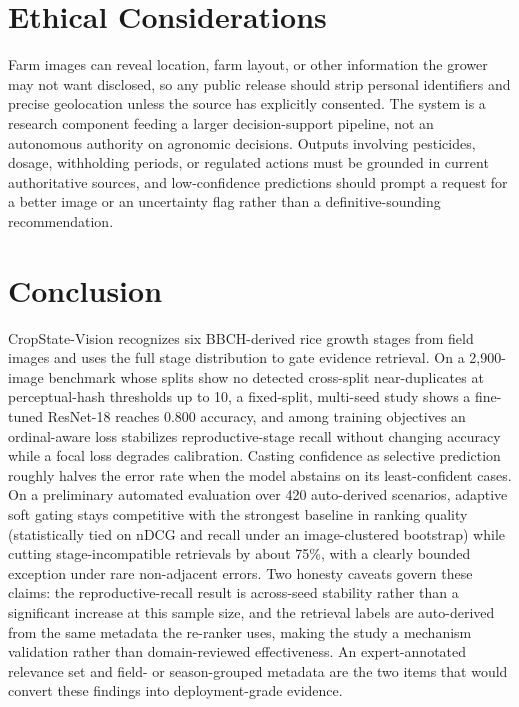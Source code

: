 \documentclass{llncs}
\begin{document}
\section{Ethical Considerations}

Farm images can reveal location, farm layout, or other information the grower may not want disclosed, so any public release should strip personal identifiers and precise geolocation unless the source has explicitly consented. The system is a research component feeding a larger decision-support pipeline, not an autonomous authority on agronomic decisions. Outputs involving pesticides, dosage, withholding periods, or regulated actions must be grounded in current authoritative sources, and low-confidence predictions should prompt a request for a better image or an uncertainty flag rather than a definitive-sounding recommendation.

\section{Conclusion}

CropState-Vision recognizes six BBCH-derived rice growth stages from field images and uses the full stage distribution to gate evidence retrieval. On a 2{,}900-image benchmark whose splits show no detected cross-split near-duplicates at perceptual-hash thresholds up to 10, a fixed-split, multi-seed study shows a fine-tuned ResNet-18 reaches 0.800 accuracy, and among training objectives an ordinal-aware loss stabilizes reproductive-stage recall without changing accuracy while a focal loss degrades calibration. Casting confidence as selective prediction roughly halves the error rate when the model abstains on its least-confident cases. On a preliminary automated evaluation over 420 auto-derived scenarios, adaptive soft gating stays competitive with the strongest baseline in ranking quality (statistically tied on nDCG and recall under an image-clustered bootstrap) while cutting stage-incompatible retrievals by about 75\%, with a clearly bounded exception under rare non-adjacent errors. Two honesty caveats govern these claims: the reproductive-recall result is across-seed stability rather than a significant increase at this sample size, and the retrieval labels are auto-derived from the same metadata the re-ranker uses, making the study a mechanism validation rather than domain-reviewed effectiveness. An expert-annotated relevance set and field- or season-grouped metadata are the two items that would convert these findings into deployment-grade evidence.
\end{document}
